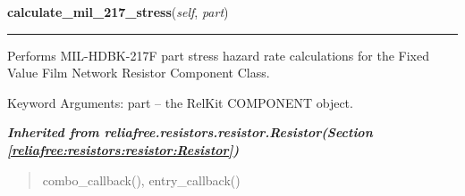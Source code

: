     \label{reliafree:resistors:fixed:FilmNetwork:calculate_mil_217_stress}

    \vspace{0.5ex}

\hspace{.8\funcindent}\begin{boxedminipage}{\funcwidth}

    \raggedright \textbf{calculate\_mil\_217\_stress}(\textit{self}, \textit{part})

    \vspace{-1.5ex}

    \rule{\textwidth}{0.5\fboxrule}
\setlength{\parskip}{2ex}
    Performs MIL-HDBK-217F part stress hazard rate calculations for the 
    Fixed Value Film Network Resistor Component Class.

    Keyword Arguments: part -- the RelKit COMPONENT object.

\setlength{\parskip}{1ex}
    \end{boxedminipage}


\large{\textbf{\textit{Inherited from reliafree.resistors.resistor.Resistor\textit{(Section \ref{reliafree:resistors:resistor:Resistor})}}}}

\begin{quote}
combo\_callback(), entry\_callback()
\end{quote}
